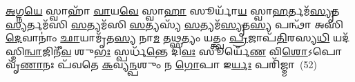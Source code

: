 {\anuvakamend[{}]}

\-\ul{𑌅}\-𑌗𑍍𑌨\-\ul{𑌯𑍇} 𑌸𑍍𑌵𑌾𑌹𑌾᳴ \ul{𑌵𑌾}\-𑌯\-\ul{𑌵𑍇} 𑌸𑍍𑌵𑌾\-\ul{𑌹𑌾} 𑌸𑍂𑌰𑍍𑌯𑌾᳴\-\ul{𑌯} 𑌸𑍍𑌵𑌾\-\ul{𑌹}\-𑌰𑍍𑌤𑌮᳴\-\ul{𑌸𑍍𑌯𑍃}\-𑌤\-\ul{𑌸𑍍𑌯}\-𑌰𑍍𑌤𑌮᳴𑌸𑌿 \ul{𑌸}\-𑌤𑍍𑌯𑌮᳴𑌸𑌿 \ul{𑌸}\-𑌤𑍍𑌯𑌸𑍍𑌯᳴ \ul{𑌸}\-𑌤𑍍𑌯𑌮᳴\-\ul{𑌸𑍍𑌯𑍃}\-𑌤\-\ul{𑌸𑍍𑌯} 𑌪𑌨𑍍𑌥𑌾᳴ 𑌅𑌸𑌿 \ul{𑌦𑍇}\-𑌵𑌾𑌨𑌾𑌂॑ \ul{𑌛𑌾}\-𑌯𑌾𑌮𑍃᳴𑌤\-\ul{𑌸𑍍𑌯} 𑌨𑌾\-\ul{𑌮} 𑌤\-\ul{𑌥𑍍𑌸}\-𑌤𑍍𑌯𑌂 𑌯𑌤𑍍𑌤𑍍𑌵𑌂 \ul{𑌪𑍍𑌰}\-𑌜𑌾𑌪᳴\-\ul{𑌤𑌿}\-𑌰𑌸𑍍𑌯\-\ul{𑌧𑌿} 𑌯𑌦᳴𑌸𑍍𑌮𑌿\-\ul{𑌨𑍍𑌵𑌾}\-𑌜𑌿𑌨𑍀᳴\-\ul{𑌵} 𑌶𑍁\-\ul{𑌭𑌃} 𑌸𑍍𑌪𑌰𑍍𑌧᳴\-\ul{𑌨𑍍𑌤𑍇} 𑌦𑌿\-\ul{𑌵𑌃} 𑌸𑍂𑌰𑍍𑌯𑍇᳴\-\ul{𑌣} 𑌵𑌿\-\ul{𑌶𑍋}\-\-𑌽𑌪𑍋 𑌵𑍃᳴\-\ul{𑌣𑌾}\-𑌨𑌃 𑌪᳴𑌵𑌤𑍇 \ul{𑌕}\-𑌵𑍍𑌯\-\ul{𑌨𑍍𑌪}\-𑌶𑍁𑌂 𑌨 \ul{𑌗𑍋}\-𑌪𑌾 𑌇\-\ul{𑌰𑍍𑌯𑌃} 𑌪𑌰𑌿᳴𑌜𑍍𑌮𑌾~(52)


{\anuvakamend[{}]}

